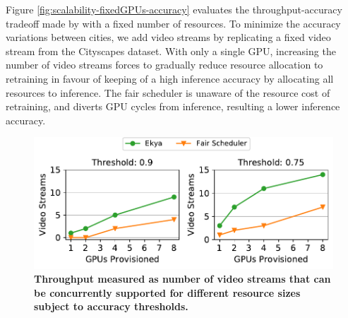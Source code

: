 Figure \ref{fig:scalability-fixedGPUs-accuracy} evaluates the throughput-accuracy tradeoff made by \name{} with a fixed number of resources. To minimize the accuracy variations between cities, we add video streams by replicating a fixed video stream from the Cityscapes dataset. 
With only a single GPU, increasing the number of video streams forces \name{} to gradually reduce resource allocation to retraining in favour of keeping of a high inference accuracy by allocating all resources to inference. The fair scheduler is unaware of the resource cost of retraining, and diverts GPU cycles from inference, resulting a lower inference accuracy.

\begin{figure}
 	\includegraphics[width=\linewidth]{results/scalability/scalability_GPUs_cams_cityscapes.pdf}
	\caption{\small \bf Throughput measured as number of video streams that can be concurrently supported for different resource sizes subject to accuracy thresholds.
	}
	\label{fig:scalability-gpu-vs-cam-thresholded}
\end{figure}

